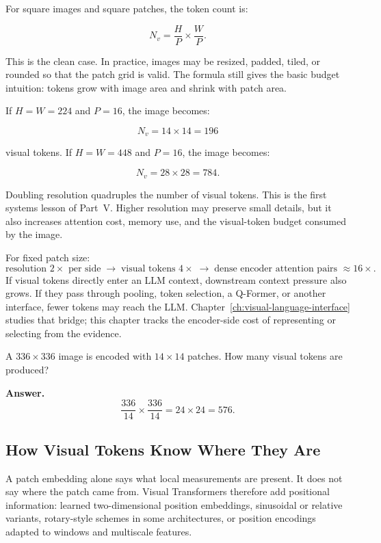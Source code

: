 For square images and square patches, the token count is:

\[
N_v = \frac{H}{P} \times \frac{W}{P}.
\]

This is the clean case. In practice, images may be resized, padded, tiled, or rounded so that the patch grid is valid. The formula still gives the basic budget intuition: tokens grow with image area and shrink with patch area.

If $H = W = 224$ and $P = 16$, the image becomes:

\[
N_v = 14 \times 14 = 196
\]

visual tokens. If $H = W = 448$ and $P = 16$, the image becomes:

\[
N_v = 28 \times 28 = 784.
\]

Doubling resolution quadruples the number of visual tokens. This is the first systems lesson of Part~V. Higher resolution may preserve small details, but it also increases attention cost, memory use, and the visual-token budget consumed by the image.

\begin{tcolorbox}[colback=blue!5, colframe=blue!40, title=\textbf{Token Count vs. Attention Cost}]
For fixed patch size:
\[
\text{resolution }2\times\text{ per side}
\;\rightarrow\;
\text{visual tokens }4\times
\;\rightarrow\;
\text{dense encoder attention pairs }\approx 16\times.
\]
If visual tokens directly enter an LLM context, downstream context pressure also grows. If they pass through pooling, token selection, a Q-Former, or another interface, fewer tokens may reach the LLM. Chapter~\ref{ch:visual-language-interface} studies that bridge; this chapter tracks the encoder-side cost of representing or selecting from the evidence.
\end{tcolorbox}

\begin{tcolorbox}[colback=blue!5, colframe=blue!40, title=\textbf{Pause and Verify}]
A $336 \times 336$ image is encoded with $14 \times 14$ patches. How many visual tokens are produced?

\medskip
\noindent\textbf{Answer.}
\[
\frac{336}{14} \times \frac{336}{14} = 24 \times 24 = 576.
\]
\end{tcolorbox}

\subsection{How Visual Tokens Know Where They Are}

A patch embedding alone says what local measurements are present. It does not say where the patch came from. Visual Transformers therefore add positional information: learned two-dimensional position embeddings, sinusoidal or relative variants, rotary-style schemes in some architectures, or position encodings adapted to windows and multiscale features.

